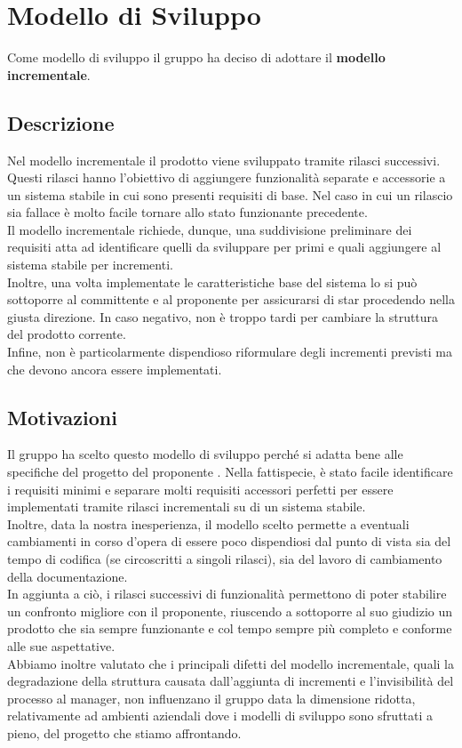 \section{Modello di Sviluppo}
Come modello di sviluppo il gruppo \Gruppo{} ha deciso di adottare il \textbf{modello incrementale}.
\subsection{Descrizione}
Nel modello incrementale il prodotto viene sviluppato tramite rilasci successivi. Questi rilasci hanno l'obiettivo di aggiungere funzionalità separate e accessorie a un sistema stabile in cui sono presenti requisiti di base.
Nel caso in cui un rilascio sia fallace è molto facile tornare allo stato funzionante precedente.\\
Il modello incrementale richiede, dunque, una suddivisione preliminare dei requisiti atta ad identificare quelli da sviluppare per primi e quali aggiungere al sistema stabile per incrementi. \\
Inoltre, una volta implementate le caratteristiche base del sistema lo si può sottoporre al committente e al proponente per assicurarsi di star procedendo nella giusta direzione.
In caso negativo, non è troppo tardi per cambiare la struttura del prodotto corrente. \\
Infine, non è particolarmente dispendioso riformulare degli incrementi previsti ma che devono ancora essere implementati. 

\subsection{Motivazioni}
Il gruppo ha scelto questo modello di sviluppo perché si adatta bene alle specifiche del progetto \NomeProgetto{} del proponente \Proponente{}.
Nella fattispecie, è stato facile identificare i requisiti minimi e separare molti requisiti accessori perfetti per essere implementati tramite rilasci incrementali su di un sistema stabile.\\
Inoltre, data la nostra inesperienza, il modello scelto permette a eventuali cambiamenti in corso d'opera di essere poco dispendiosi dal punto di vista sia del tempo di codifica (se circoscritti a singoli rilasci), sia del lavoro di cambiamento della documentazione. \\
In aggiunta a ciò, i rilasci successivi di funzionalità permettono di poter stabilire un confronto migliore con il proponente, riuscendo a sottoporre al suo giudizio un prodotto che sia sempre funzionante e col tempo sempre più completo e conforme alle sue aspettative. \\
Abbiamo inoltre valutato che i principali difetti del modello incrementale, quali la degradazione della struttura causata dall'aggiunta di incrementi e l'invisibilità del processo al manager, 
non influenzano il gruppo data la dimensione ridotta, relativamente ad ambienti aziendali dove i modelli di sviluppo sono sfruttati a pieno, del progetto che stiamo affrontando.


